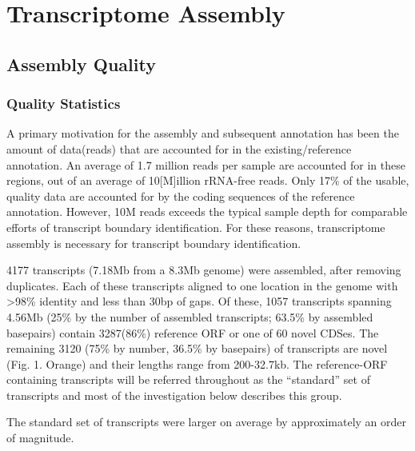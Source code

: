 

\chapter{Transcriptome Assembly}

\section{Assembly Quality}

\subsection{Quality Statistics}


A primary motivation for the assembly and subsequent annotation has been the amount of data(reads) that are accounted for in the existing/reference annotation. An average of 1.7 million reads per sample are accounted for in these regions, out of an average of 10[M]illion rRNA-free reads.  Only 17\% of the usable, quality data are accounted for by the coding sequences of the reference annotation. However, 10M reads exceeds the typical sample depth for comparable efforts of transcript boundary identification. For these reasons, transcriptome assembly is necessary for transcript boundary identification.

4177 transcripts (7.18Mb from a 8.3Mb genome) were assembled, after removing duplicates. Each of these transcripts aligned to one location in the genome with \textgreater 98\% identity and less than 30bp of gaps. Of these, 1057 transcripts spanning 4.56Mb (25\% by the number of assembled transcripts;  63.5\% by assembled basepairs) contain 3287(86\%) reference ORF or one of 60 novel CDSes.  The remaining 3120 (75\% by number, 36.5\% by basepairs) of transcripts are novel (Fig. 1. Orange) and their lengths range from 200-32.7kb. The reference-ORF containing transcripts will be referred throughout as the ``standard'' set of transcripts and most of the investigation below describes this group.

The standard set of transcripts were larger on average by approximately an order of magnitude.

